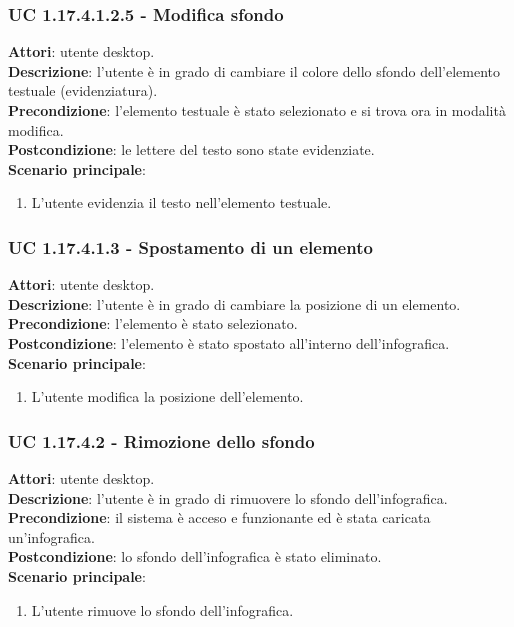 \subsubsection{UC 1.17.4.1.2.5 - Modifica sfondo}{
	\label{uc1.17.4.1.2.5}
	\textbf{Attori}: utente desktop. \\
	\textbf{Descrizione}: l'utente è in grado di cambiare il colore dello sfondo dell’elemento testuale (evidenziatura). \\
	\textbf{Precondizione}: l'elemento testuale è stato selezionato e si trova ora in modalità modifica.\\
	\textbf{Postcondizione}: le lettere del testo sono state evidenziate.\\
	\textbf{Scenario principale}:
	\begin{enumerate}
		\item L'utente evidenzia il testo nell’elemento testuale.
	\end{enumerate}			
	}
\subsubsection{UC 1.17.4.1.3 - Spostamento di un elemento}{
	\label{uc1.17.4.1.3}
	\textbf{Attori}: utente desktop. \\
	\textbf{Descrizione}: l'utente è in grado di cambiare la posizione di un elemento. \\
	\textbf{Precondizione}: l'elemento è stato selezionato.\\
	\textbf{Postcondizione}: l'elemento è stato spostato all’interno dell’infografica.\\
	\textbf{Scenario principale}:
	\begin{enumerate}
		\item L'utente modifica la posizione dell'elemento.
	\end{enumerate}			
	}
\subsubsection{UC 1.17.4.2 - Rimozione dello sfondo}{
	\label{uc1.17.4.2}
	\textbf{Attori}: utente desktop. \\
	\textbf{Descrizione}: l'utente è in grado di rimuovere lo sfondo dell’infografica. \\
	\textbf{Precondizione}: il sistema è acceso e funzionante ed è stata caricata un'infografica.	\\
	\textbf{Postcondizione}: lo sfondo dell'infografica è stato eliminato.\\
	\textbf{Scenario principale}:
	\begin{enumerate}
		\item L'utente rimuove lo sfondo dell'infografica.
	\end{enumerate}			
	}
